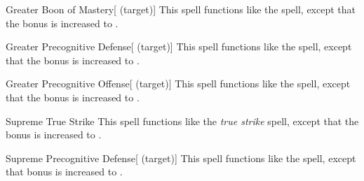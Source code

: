\lowercase{\hypertarget{spell:Greater Boon of Mastery}{}}\label{spell:Greater Boon of Mastery}
\begin{attuneability}[\nth{4}]{\hypertarget{spell:Greater Boon of Mastery}{Greater Boon of Mastery}}[ (target)]
This spell functions like the  spell, except that the bonus is increased to .
\end{attuneability}
\vspace{0.25em}



\lowercase{\hypertarget{spell:Greater Precognitive Defense}{}}\label{spell:Greater Precognitive Defense}
\begin{attuneability}[\nth{4}]{\hypertarget{spell:Greater Precognitive Defense}{Greater Precognitive Defense}}[ (target)]
This spell functions like the  spell, except that the bonus is increased to .
\end{attuneability}
\vspace{0.25em}



\lowercase{\hypertarget{spell:Greater Precognitive Offense}{}}\label{spell:Greater Precognitive Offense}
\begin{attuneability}[\nth{5}]{\hypertarget{spell:Greater Precognitive Offense}{Greater Precognitive Offense}}[ (target)]
This spell functions like the  spell, except that the bonus is increased to .
\end{attuneability}
\vspace{0.25em}



\lowercase{\hypertarget{spell:Supreme True Strike}{}}\label{spell:Supreme True Strike}
\begin{freeability}[\nth{5}]{\hypertarget{spell:Supreme True Strike}{Supreme True Strike}}
This spell functions like the \textit{true strike} spell, except that the bonus is increased to .
\end{freeability}
\vspace{0.25em}



\lowercase{\hypertarget{spell:Supreme Precognitive Defense}{}}\label{spell:Supreme Precognitive Defense}
\begin{attuneability}[\nth{7}]{\hypertarget{spell:Supreme Precognitive Defense}{Supreme Precognitive Defense}}[ (target)]
This spell functions like the  spell, except that bonus is increased to .
\end{attuneability}
\vspace{0.25em}



